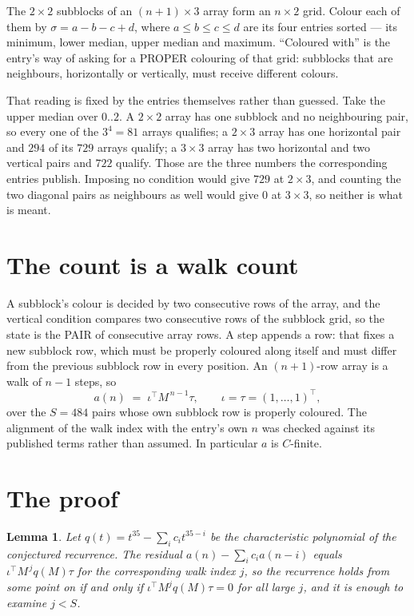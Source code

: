 \documentclass[11pt,a4paper]{article}
\theoremstyle{plain}
\newtheorem{lemma}[theorem]{Lemma}
\theoremstyle{definition}
\begin{document}
The $2\times2$ subblocks of an $(n+1)\times3$ array form an
$n\times2$ grid. Colour each of them by $\sigma=a-b-c+d$, where $a\le b\le c\le d$ are its four entries sorted --- its minimum, lower median, upper median and maximum. ``Coloured with'' is the entry's way of
asking for a PROPER colouring of that grid: subblocks that are neighbours, horizontally or
vertically, must receive different colours.

That reading is fixed by the entries themselves rather than guessed. Take the upper median
over $0..2$. A $2\times2$ array has one subblock and no neighbouring pair, so every one of the
$3^4=81$ arrays qualifies; a $2\times3$ array has one horizontal pair and $294$ of its $729$
arrays qualify; a $3\times3$ array has two horizontal and two vertical pairs and $722$
qualify. Those are the three numbers the corresponding entries publish. Imposing no condition
would give $729$ at $2\times3$, and counting the two diagonal pairs as neighbours as well
would give $0$ at $3\times3$, so neither is what is meant.

\section{The count is a walk count}

A subblock's colour is decided by two consecutive rows of the array, and
the vertical condition compares two consecutive rows of the subblock grid, so the state is the
PAIR of consecutive array rows. A step appends a row: that fixes a new subblock row, which
must be properly coloured along itself and must differ from the previous subblock row in every
position. An $(n+1)$-row array is a walk of $n-1$ steps, so
\[
a(n)\;=\;\iota^{\!\top}M^{\,n-1}\tau,\qquad\iota=\tau=(1,\dots,1)^{\!\top},
\]
over the $S=484$ pairs whose own subblock row is properly coloured.
The alignment of the walk index with the entry's own $n$ was checked against its published
terms rather than assumed. In particular $a$ is $C$-finite.

\section{The proof}

\begin{lemma}\label{lem:crit}
Let $q(t)=t^{35}-\sum_i c_it^{35-i}$ be the characteristic polynomial of the
conjectured recurrence. The residual $a(n)-\sum_ic_ia(n-i)$ equals
$\iota^{\!\top}M^{\,j}q(M)\tau$ for the corresponding walk index $j$, so the recurrence
holds from some point on if and only if $\iota^{\!\top}M^{j}q(M)\tau=0$ for all large $j$,
and it is enough to examine $j<S$.
\end{lemma}
\end{document}
